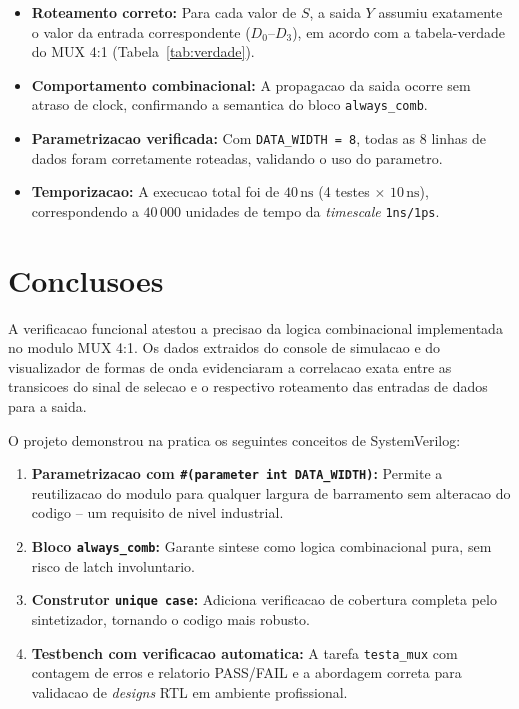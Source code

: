 \documentclass[12pt, a4paper]{article}
\begin{document}
\begin{itemize}
  \item \textbf{Roteamento correto:} Para cada valor de $S$, a saida $Y$ assumiu
        exatamente o valor da entrada correspondente ($D_0$--$D_3$), em acordo com
        a tabela-verdade do MUX 4:1 (Tabela~\ref{tab:verdade}).
  \item \textbf{Comportamento combinacional:} A propagacao da saida ocorre sem atraso
        de clock, confirmando a semantica do bloco \texttt{always\_comb}.
  \item \textbf{Parametrizacao verificada:} Com \texttt{DATA\_WIDTH = 8}, todas as
        8 linhas de dados foram corretamente roteadas, validando o uso do parametro.
  \item \textbf{Temporizacao:} A execucao total foi de $40\,\text{ns}$ (4 testes
        $\times$ $10\,\text{ns}$), correspondendo a $40\,000$ unidades de tempo da
        \textit{timescale} \texttt{1ns/1ps}.
\end{itemize}

\section{Conclusoes}

A verificacao funcional atestou a precisao da logica combinacional implementada
no modulo MUX 4:1. Os dados extraidos do console de simulacao e do visualizador
de formas de onda evidenciaram a correlacao exata entre as transicoes do sinal de
selecao e o respectivo roteamento das entradas de dados para a saida.

O projeto demonstrou na pratica os seguintes conceitos de SystemVerilog:

\begin{enumerate}
  \item \textbf{Parametrizacao com \texttt{\#(parameter int DATA\_WIDTH)}:}
        Permite a reutilizacao do modulo para qualquer largura de barramento
        sem alteracao do codigo -- um requisito de nivel industrial.
  \item \textbf{Bloco \texttt{always\_comb}:} Garante sintese como logica
        combinacional pura, sem risco de latch involuntario.
  \item \textbf{Construtor \texttt{unique case}:} Adiciona verificacao de cobertura
        completa pelo sintetizador, tornando o codigo mais robusto.
  \item \textbf{Testbench com verificacao automatica:} A tarefa \texttt{testa\_mux}
        com contagem de erros e relatorio PASS/FAIL e a abordagem correta para
        validacao de \textit{designs} RTL em ambiente profissional.
\end{enumerate}
\end{document}
